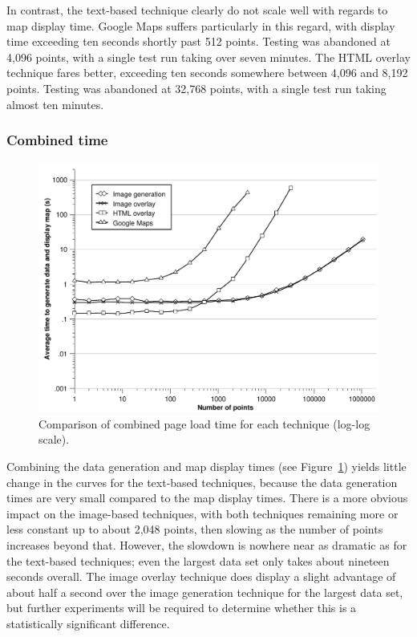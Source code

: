 \documentclass[acmnow]{acmtrans2m}
\begin{document}
In contrast, the text-based technique clearly do not scale well with
regards to map display time. Google Maps suffers particularly in this
regard, with display time exceeding ten seconds shortly past 512 points.
Testing was abandoned at 4,096 points, with a single test run taking
over seven minutes. The HTML overlay technique fares better, exceeding
ten seconds somewhere between 4,096 and 8,192 points. Testing was
abandoned at 32,768 points, with a single test run taking almost ten
minutes.


\subsubsection{Combined time}


\begin{figure}
	\centering
	\includegraphics[scale=0.55]{combined_time}
	\caption{Comparison of combined page load time for each technique (log-log scale).}
	\label{fig-combined-time}
\end{figure}


Combining the data generation and map display times (see
Figure~\ref{fig-combined-time}) yields little change in the curves for
the text-based techniques, because the data generation times are very
small compared to the map display times. There is a more obvious impact
on the image-based techniques, with both techniques remaining more or
less constant up to about 2,048 points, then slowing as the number of
points increases beyond that. However, the slowdown is nowhere near as
dramatic as for the text-based techniques; even the largest data set
only takes about nineteen seconds overall. The image overlay technique
does display a slight advantage of about half a second over the image
generation technique for the largest data set, but further experiments
will be required to determine whether this is a statistically
significant difference.
\end{document}
